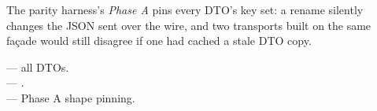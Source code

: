 The parity harness's \emph{Phase A} pins every DTO's key set:
a rename silently changes the JSON sent over the wire, and two
transports built on the same façade would still disagree if one
had cached a stale DTO copy.

\begin{inthecode}
 --- all DTOs.\\
 --- .\\
 ---
Phase A shape pinning.
\end{inthecode}
